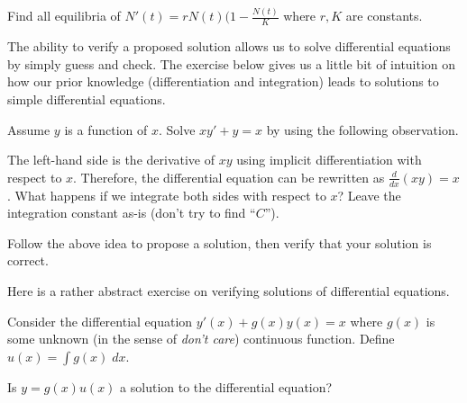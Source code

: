 \documentclass[../main.tex]{subfiles}
\begin{document}
\begin{example}
  Find all equilibria of \(N'(t) = r N(t) (1 - \frac{N(t)}{K}\) where \(r,K\) are constants.

\end{example}
\clearpage

The ability to verify a proposed solution allows us to solve differential equations by simply guess and check. The exercise below gives us a little bit of intuition on how our prior knowledge (differentiation and integration) leads to solutions to simple differential equations.
\begin{example}
  Assume \(y\) is a function of \(x\). Solve \(xy' + y = x\) by using the following observation.

  The left-hand side is the derivative of \(xy\) using implicit differentiation with respect to \(x\). Therefore, the differential equation can be rewritten as \(\frac{d}{dx} \left( xy \right) = x\). What happens if we integrate both sides with respect to \(x\)?  Leave the integration constant as-is (don't try to find ``\(C\)'').

  Follow the above idea to propose a solution, then verify that your solution is correct. 

\end{example}
\clearpage

Here is a rather abstract exercise on verifying solutions of differential equations.

\begin{example}
  Consider the differential equation \(y'(x) + g(x) y(x) = x\) where \(g(x)\) is some unknown (in the sense of \emph{don't care}) continuous function. Define \(u(x) = \int g(x) \;dx\). 

  Is \(y = g(x)u(x)\) a solution to the differential equation? 

\end{example}
\clearpage

\end{document}
